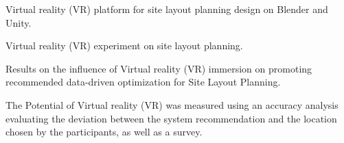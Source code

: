 
\item Virtual reality (VR) platform for site layout planning design on Blender and Unity.
\item Virtual reality (VR) experiment on site layout planning. 
\item Results on the influence of Virtual reality (VR) immersion on promoting recommended data-driven optimization for Site Layout Planning.
\item The Potential of Virtual reality (VR) was measured using an accuracy analysis evaluating the deviation between the system recommendation and the location chosen by the participants, as well as a survey.